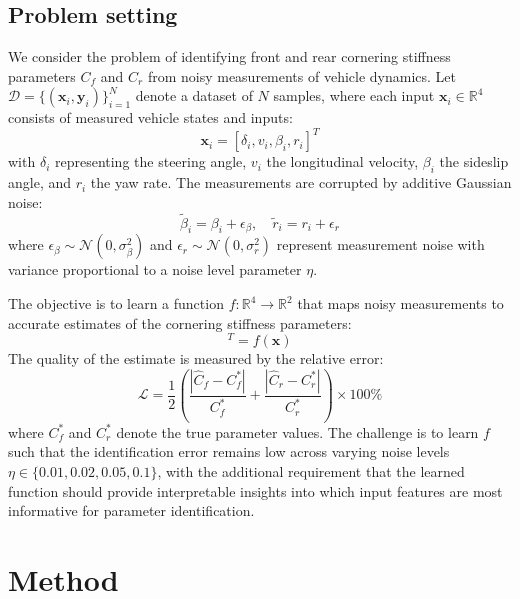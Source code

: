 \documentclass[Afour,sageh,times]{sagej}
\begin{document}
\subsection{Problem setting}
\label{sec:problem_setting}

We consider the problem of identifying front and rear cornering stiffness parameters $C_f$ and $C_r$ from noisy measurements of vehicle dynamics. Let $\mathcal{D} = \{(\mathbf{x}_i, \mathbf{y}_i)\}_{i=1}^N$ denote a dataset of $N$ samples, where each input $\mathbf{x}_i \in \mathbb{R}^4$ consists of measured vehicle states and inputs:
\begin{equation}
\mathbf{x}_i = [\delta_i, v_i, \beta_i, r_i]^T
\end{equation}
with $\delta_i$ representing the steering angle, $v_i$ the longitudinal velocity, $\beta_i$ the sideslip angle, and $r_i$ the yaw rate. The measurements are corrupted by additive Gaussian noise:
\begin{equation}
\tilde{\beta}_i = \beta_i + \epsilon_\beta, \quad \tilde{r}_i = r_i + \epsilon_r
\end{equation}
where $\epsilon_\beta \sim \mathcal{N}(0, \sigma_\beta^2)$ and $\epsilon_r \sim \mathcal{N}(0, \sigma_r^2)$ represent measurement noise with variance proportional to a noise level parameter $\eta$.

The objective is to learn a function $f: \mathbb{R}^4 \rightarrow \mathbb{R}^2$ that maps noisy measurements to accurate estimates of the cornering stiffness parameters:
\begin{equation}
[\hat{C}_f, \hat{C}_r]^T = f(\mathbf{x})
\end{equation}
The quality of the estimate is measured by the relative error:
\begin{equation}
\mathcal{L} = \frac{1}{2}\left(\frac{|\hat{C}_f - C_f^*|}{C_f^*} + \frac{|\hat{C}_r - C_r^*|}{C_r^*}\right) \times 100\%
\end{equation}
where $C_f^*$ and $C_r^*$ denote the true parameter values. The challenge is to learn $f$ such that the identification error remains low across varying noise levels $\eta \in \{0.01, 0.02, 0.05, 0.1\}$, with the additional requirement that the learned function should provide interpretable insights into which input features are most informative for parameter identification.

\section{Method}
\label{sec:method}
\end{document}
